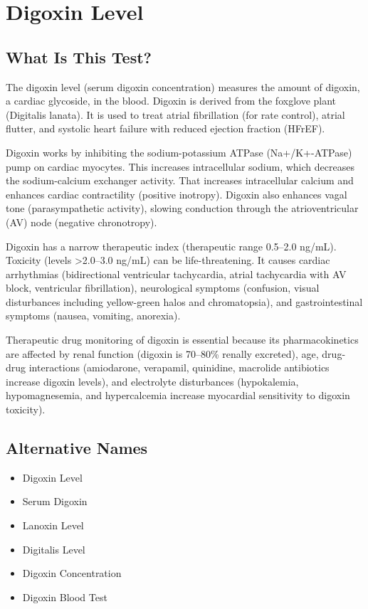 \chapter{Digoxin Level}

\section*{What Is This Test?}
The digoxin level (serum digoxin concentration) measures the amount of digoxin, a cardiac glycoside, in the blood. Digoxin is derived from the foxglove plant (Digitalis lanata). It is used to treat atrial fibrillation (for rate control), atrial flutter, and systolic heart failure with reduced ejection fraction (HFrEF).

Digoxin works by inhibiting the sodium-potassium ATPase (Na+/K+-ATPase) pump on cardiac myocytes. This increases intracellular sodium, which decreases the sodium-calcium exchanger activity. That increases intracellular calcium and enhances cardiac contractility (positive inotropy). Digoxin also enhances vagal tone (parasympathetic activity), slowing conduction through the atrioventricular (AV) node (negative chronotropy).

Digoxin has a narrow therapeutic index (therapeutic range 0.5--2.0 ng/mL). Toxicity (levels >2.0--3.0 ng/mL) can be life-threatening. It causes cardiac arrhythmias (bidirectional ventricular tachycardia, atrial tachycardia with AV block, ventricular fibrillation), neurological symptoms (confusion, visual disturbances including yellow-green halos and chromatopsia), and gastrointestinal symptoms (nausea, vomiting, anorexia).

Therapeutic drug monitoring of digoxin is essential because its pharmacokinetics are affected by renal function (digoxin is 70--80\% renally excreted), age, drug-drug interactions (amiodarone, verapamil, quinidine, macrolide antibiotics increase digoxin levels), and electrolyte disturbances (hypokalemia, hypomagnesemia, and hypercalcemia increase myocardial sensitivity to digoxin toxicity).

\section*{Alternative Names}
\begin{itemize}
  \item Digoxin Level
  \item Serum Digoxin
  \item Lanoxin Level
  \item Digitalis Level
  \item Digoxin Concentration
  \item Digoxin Blood Test
\end{itemize}
